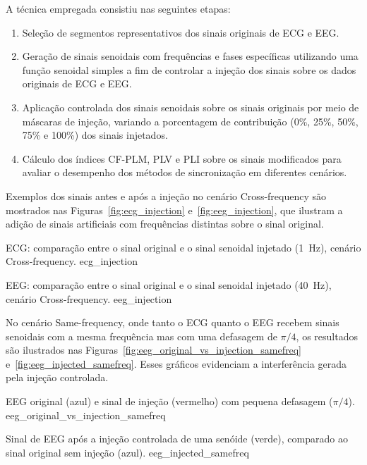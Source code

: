 \begin{itemize}
A técnica empregada consistiu nas seguintes etapas:
\begin{enumerate}
    \item Seleção de segmentos representativos dos sinais originais de ECG e EEG.
    \item Geração de sinais senoidais com frequências e fases específicas utilizando uma função senoidal simples a fim de controlar a injeção dos sinais sobre os dados originais de ECG e EEG.
    \item Aplicação controlada dos sinais senoidais sobre os sinais originais por meio de máscaras de injeção, variando a porcentagem de contribuição (0\%, 25\%, 50\%, 75\% e 100\%) dos sinais injetados.
    \item Cálculo dos índices CF-PLM, PLV e PLI sobre os sinais modificados para avaliar o desempenho dos métodos de sincronização em diferentes cenários.
\end{enumerate}


Exemplos dos sinais antes e após a injeção no cenário Cross-frequency são mostrados nas Figuras~\ref{fig:ecg_injection} e~\ref{fig:eeg_injection}, que ilustram a adição de sinais artificiais com frequências distintas sobre o sinal original.

{ECG: comparação entre o sinal original e o sinal senoidal injetado (1~Hz), cenário Cross-frequency.}
{ecg_injection}

{EEG: comparação entre o sinal original e o sinal senoidal injetado (40~Hz), cenário Cross-frequency.}
{eeg_injection}


No cenário Same-frequency, onde tanto o ECG quanto o EEG recebem sinais senoidais com a mesma frequência mas com uma defasagem de \(\pi/4\), os resultados são ilustrados nas Figuras~\ref{fig:eeg_original_vs_injection_samefreq} e~\ref{fig:eeg_injected_samefreq}. Esses gráficos evidenciam a interferência gerada pela injeção controlada.

{EEG original (azul) e sinal de injeção (vermelho) com pequena defasagem (\(\pi/4\)).}
{eeg_original_vs_injection_samefreq}

{Sinal de EEG após a injeção controlada de uma senóide (verde), comparado ao sinal original sem injeção (azul).}
{eeg_injected_samefreq}


\end{itemize}
